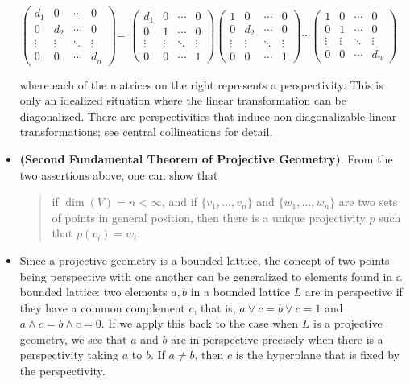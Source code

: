 \documentclass[12pt]{article}
\begin{document}
\begin{itemize}
\begin{center}
$\begin{pmatrix}
d_1 & 0 & \cdots & 0 \\
0 & d_2 & \cdots & 0 \\
\vdots & \vdots & \ddots & \vdots \\
0 & 0 & \cdots & d_n
\end{pmatrix}$=
$\begin{pmatrix}
d_1 & 0 & \cdots & 0 \\
0 & 1 & \cdots & 0 \\
\vdots & \vdots & \ddots & \vdots \\
0 & 0 & \cdots & 1
\end{pmatrix}
\begin{pmatrix}
1 & 0 & \cdots & 0 \\
0 & d_2 & \cdots & 0 \\
\vdots & \vdots & \ddots & \vdots \\
0 & 0 & \cdots & 1
\end{pmatrix}
\cdots
\begin{pmatrix}
1 & 0 & \cdots & 0 \\
0 & 1 & \cdots & 0 \\
\vdots & \vdots & \ddots & \vdots \\
0 & 0 & \cdots & d_n
\end{pmatrix}$
\end{center}
where each of the matrices on the right represents a perspectivity.  This is only an idealized situation where the linear transformation can be diagonalized.  There are perspectivities that induce non-diagonalizable linear transformations; see central collineations for detail.
\item \textbf{(Second Fundamental Theorem of Projective Geometry)}.  From the two assertions above, one can show that 
\begin{quote}
if $\operatorname{dim}(V)=n < \infty$, and if $\lbrace v_1,\ldots,v_n
\rbrace$ and $\lbrace w_1,\ldots, w_n\rbrace$ are two sets of points in general position, then there is a unique projectivity $p$ such that $p(v_i)=w_i$.
\end{quote}
\item Since a projective geometry is a bounded lattice, the concept of two points being perspective with one another can be generalized to elements found in a bounded lattice: two elements $a,b$ in a bounded lattice $L$ are in perspective if they have a common complement $c$, that is, $a\vee c=b\vee c=1$ and $a\wedge c=b\wedge c=0$.  If we apply this back to the case when $L$ is a projective geometry, we see that $a$ and $b$ are in perspective precisely when there is a perspectivity taking $a$ to $b$.  If $a\ne b$, then $c$ is the
hyperplane that is fixed by the perspectivity.
\end{itemize}
\end{document}
